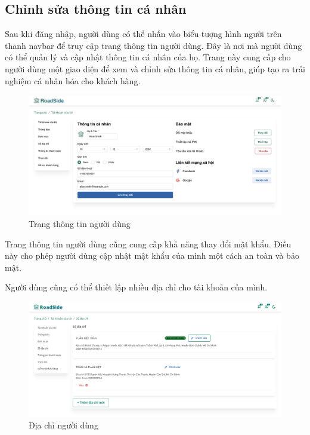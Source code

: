 \subsection{Chỉnh sửa thông tin cá nhân}
Sau khi đăng nhập, người dùng có thể nhấn vào biểu tượng hình người trên thanh navbar để truy cập trang thông tin người dùng. Đây là nơi mà người dùng có thể quản lý và cập nhật thông tin cá nhân của họ. Trang này cung cấp cho người dùng một giao diện để xem và chỉnh sửa thông tin cá nhân, giúp tạo ra trải nghiệm cá nhân hóa cho khách hàng.

    \begin{figure}[H]
        \centering
        \includegraphics[scale=0.3] {Images/UI/info profile.png}
        \vspace{1em}
        \caption{Trang thông tin người dùng}
    \end{figure}
Trang thông tin người dùng cũng cung cấp khả năng thay đổi mật khẩu. Điều này cho phép người dùng cập nhật mật khẩu của mình một cách an toàn và bảo mật.

Người dùng cũng có thể thiết lập nhiều địa chỉ cho tài khoản của mình.  

\begin{figure}[H]
    \centering
    \includegraphics[scale=0.3] {Images/UI/address.png}
    \vspace{1em}
    \caption{Địa chỉ người dùng}
\end{figure}
